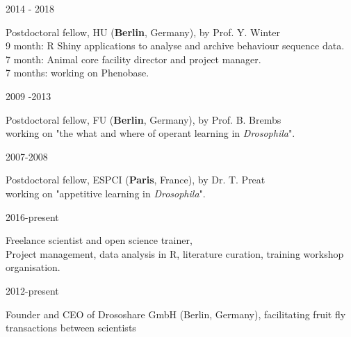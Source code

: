 %
\parbox{0.15\textwidth}{2014 - 2018}\hfill
\parbox[t]{0.83\textwidth}{Postdoctoral fellow,
       HU  (\textbf{Berlin}, Germany),
        by Prof. Y. Winter\\
       9 month: R Shiny applications to analyse and archive behaviour sequence data.\\
      7 month: Animal core facility director and project manager.\\
       7 months: working on Phenobase.}
\parbox{0.15\textwidth}{2009 -2013}\hfill
\parbox[t]{0.83\textwidth}{Postdoctoral fellow,
       FU (\textbf{Berlin}, Germany),
        by Prof. B. Brembs\\
        working on "the what and where of operant learning in \textit{Drosophila}".}
                \parbox{0.15\textwidth}{2007-2008}\hfill
\parbox[t]{0.83\textwidth}{Postdoctoral fellow,
       ESPCI (\textbf{Paris}, France), by Dr. T. Preat\\
        working on "appetitive learning in \textit{Drosophila}".
        }


%
\parbox{0.15\textwidth}{2016-present}\hfill
\parbox[t]{0.83\textwidth}{Freelance scientist and open science trainer,\\
        Project management, data analysis in R, literature curation, training workshop organisation.}
%        
\parbox{0.15\textwidth}{2012-present}\hfill
\parbox[t]{0.83\textwidth}{Founder and CEO 
       of Drososhare GmbH (Berlin, Germany),
        facilitating fruit fly transactions between scientists}

  
%
                
